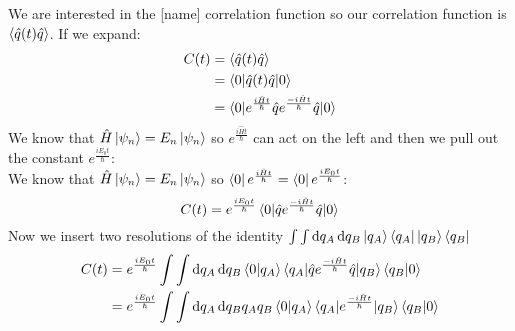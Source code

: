 \documentclass[12pt,letterpaper,oneside,final,titlepage]{article}               %
\numberwithin{equation}{section} %
\newcommand{\emiHt}{e^{\frac{-i\hat{H}t}{\hbar}}}
\newcommand{\eiHt}{e^{\frac{i\hat{H}t}{\hbar}}}
\begin{document}
We are interested in the [name] correlation function so our correlation function is $\braket{\hat{q}(t)\hat{q}}$. 
If we expand:
\begin{align}
    C(t) &= \braket{\hat{q}(t)\hat{q}}
    \\   &= \braket{0|\hat{q}(t)\hat{q}|0}
    \\   &= \braket{0|\eiHt\hat{q}\emiHt\hat{q}|0}
\end{align}
We know that $\hat{H}\ket{\psi_{n}} = E_{n}\ket{\psi_{n}}$ so $\eiHt$ can act on the left and 
then we pull out the constant $e^{\frac{iE_{0}t}{\hbar}}$:\\
We know that $\hat{H}\ket{\psi_{n}} = E_{n}\ket{\psi_{n}}$ so $\bra{0}\eiHt = \bra{0}e^{\frac{iE_{0}t}{\hbar}}$:
\begin{equation}
    C(t) = e^{\frac{iE_{0}t}{\hbar}}\braket{0|\hat{q}\emiHt\hat{q}|0}
\end{equation}
Now we insert two resolutions of the identity
$\int\int \dif q_{A}\dif q_{B} \ket{q_{A}}\bra{q_{A}}\ket{q_{B}}\bra{q_{B}}$
\begin{align}
    C(t) &= e^{\frac{iE_{0}t}{\hbar}}\int\int \dif q_{A}\dif q_{B} 
    \braket{0|q_{A}}\braket{q_{A}|\hat{q}\emiHt\hat{q}|q_{B}}\braket{q_{B}|0}
    \\   &= e^{\frac{iE_{0}t}{\hbar}}\int\int \dif q_{A}\dif q_{B} 
    q_{A}q_{B}\braket{0|q_{A}}\braket{q_{A}|\emiHt|q_{B}}\braket{q_{B}|0}
    \label{eq:cor_ins}
\end{align}
\end{document}
